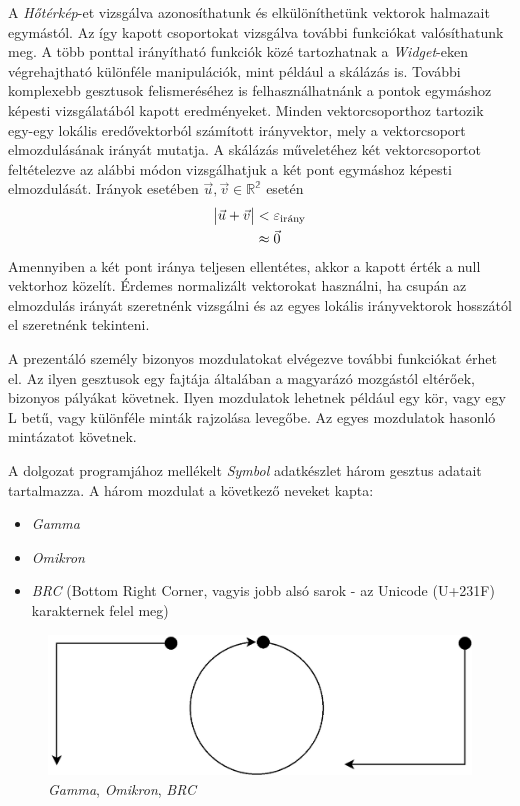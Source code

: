 
A \textit{Hőtérkép}-et vizsgálva azonosíthatunk és elkülöníthetünk vektorok halmazait egymástól. Az így kapott csoportokat vizsgálva további funkciókat valósíthatunk meg. A több ponttal irányítható funkciók közé tartozhatnak a \textit{Widget}-eken végrehajtható különféle manipulációk, mint például a skálázás is. További komplexebb gesztusok felismeréséhez is felhasználhatnánk a pontok egymáshoz képesti vizsgálatából kapott eredményeket.
Minden vektorcsoporthoz tartozik egy-egy lokális eredővektorból számított irányvektor, mely a vektorcsoport elmozdulásának irányát mutatja.
A skálázás műveletéhez két vektorcsoportot feltételezve az alábbi módon vizsgálhatjuk a két pont egymáshoz képesti elmozdulását.
Irányok esetében $\vec{u},\vec{v}\in \mathbb{R^2}$ esetén
\begin{align*}
\vmatrix \vec{u}+\vec{v} \endvmatrix &< \varepsilon_{\text{irány}}\\
&\approx \vec{0}
\end{align*}
Amennyiben a két pont iránya teljesen ellentétes, akkor a kapott érték a null vektorhoz közelít. Érdemes normalizált vektorokat használni, ha csupán az elmozdulás irányát szeretnénk vizsgálni és az egyes lokális irányvektorok hosszától el szeretnénk tekinteni.


A prezentáló személy bizonyos mozdulatokat elvégezve további funkciókat érhet el. Az ilyen gesztusok egy fajtája általában a magyarázó mozgástól eltérőek, bizonyos pályákat követnek. Ilyen mozdulatok lehetnek például egy kör, vagy egy L betű, vagy különféle minták rajzolása levegőbe. Az egyes mozdulatok hasonló mintázatot követnek.

A dolgozat programjához mellékelt \textit{Symbol} adatkészlet három gesztus adatait tartalmazza. A három mozdulat a következő neveket kapta:
\begin{itemize}
	\item \textit{Gamma}
	\item \textit{Omikron}
	\item \textit{BRC} (Bottom Right Corner, vagyis jobb alsó sarok - az Unicode (U+231F) karakternek felel meg)
\end{itemize}
\begin{figure}[h]
\centering
\includegraphics[width=10truecm]{images/symbols.png}
\caption{\textit{Gamma}, \textit{Omikron}, \textit{BRC}}
\label{fig:symbols}
\end{figure}

